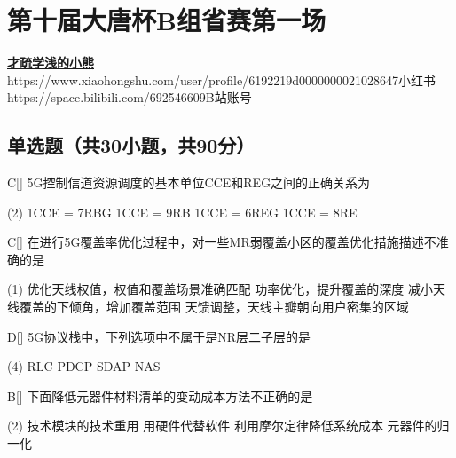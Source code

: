 \chapter{第十届大唐杯B组省赛第一场}
\fancyhead[R]{\color{H6}\kaishu\rightmark\,}

\date{2023年4月08日}{}{\href{https://qm.qq.com/q/UPbGudx8cK}{\textbf{才疏学浅的小熊}}}
{}
{https://www.xiaohongshu.com/user/profile/6192219d0000000021028647}{小红书}
{https://space.bilibili.com/692546609}{B站账号}



\section{单选题（共30小题，共90分）}



\begin{choice}{C}[]
    5G控制信道资源调度的基本单位CCE和REG之间的正确关系为
    \begin{tasks}(2)
        \task 1CCE = 7RBG
        \task 1CCE = 9RB
        \task 1CCE = 6REG
        \task 1CCE = 8RE
    \end{tasks}
\end{choice}


\begin{choice}{C}[]
    在进行5G覆盖率优化过程中，对一些MR弱覆盖小区的覆盖优化措施描述不准确的是
    \begin{tasks}(1)
        \task 优化天线权值，权值和覆盖场景准确匹配
        \task 功率优化，提升覆盖的深度
        \task 减小天线覆盖的下倾角，增加覆盖范围
        \task 天馈调整，天线主瓣朝向用户密集的区域
    \end{tasks}
\end{choice}




\begin{choice}{D}[]
    5G协议栈中，下列选项中不属于是NR层二子层的是
    \begin{tasks}(4)
        \task RLC
        \task PDCP
        \task SDAP
        \task NAS
    \end{tasks}
\end{choice}


\begin{choice}{B}[]
    下面降低元器件材料清单的变动成本方法不正确的是
    \begin{tasks}(2)
        \task 技术模块的技术重用
        \task 用硬件代替软件
        \task 利用摩尔定律降低系统成本
        \task 元器件的归一化
    \end{tasks}
\end{choice}

